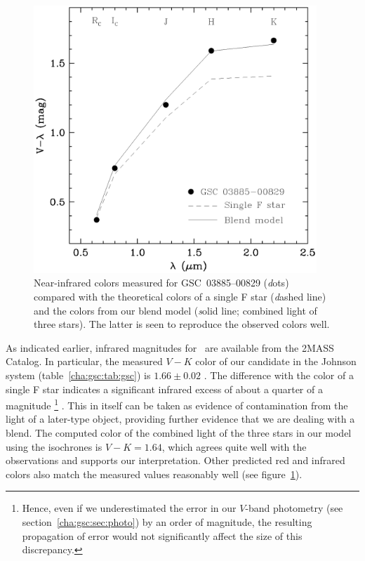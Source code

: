 \begin{figure}
\begin{center}
\includegraphics[width=0.95\textwidth]{3_f7}
\caption[Near-infrared colors for \mbox{GSC 03885--00829} and an F star]{Near-infrared colors measured for \mbox{GSC 03885--00829}
  ({\textit dots}) compared with the theoretical colors of a single F star
  ({\textit dashed line}) and the colors from our blend model ({\textit solid line};
  combined light of three stars). The latter is seen to reproduce the
  observed colors well.}\label{cha:gsc:fig:colors}
\end{center}
\end{figure}

As indicated earlier, infrared magnitudes for \gscOTE\ are
available from the 2MASS Catalog.  In particular, the measured $V-K$
color of our candidate in the Johnson system (table~\ref{cha:gsc:tab:gsc}) is
$1.66 \pm 0.02$
\citep[using transformations from the 2MASS system
by][]{Carpenter:aj:2001a}. The difference with the color of a single F star
indicates a significant infrared excess of about a quarter of a
magnitude%
\footnote{Hence, even if we underestimated the error in our $V$-band
  photometry (see section~\ref{cha:gsc:sec:photo}) by an order of magnitude, the
  resulting propagation of error would not significantly affect the
  size of this discrepancy.}%
. This in itself can be taken as evidence of contamination
from the light of a later-type object, providing further evidence that
we are dealing with a blend. The computed color of the combined light
of the three stars in our model using the
 \citet{Baraffe_Chabrier_Allard:aa:1998a} isochrones
is $V-K = 1.64$, which agrees quite well with the observations and
supports our interpretation. Other predicted red and infrared colors
also match the measured values reasonably well (see figure~\ref{cha:gsc:fig:colors}).

